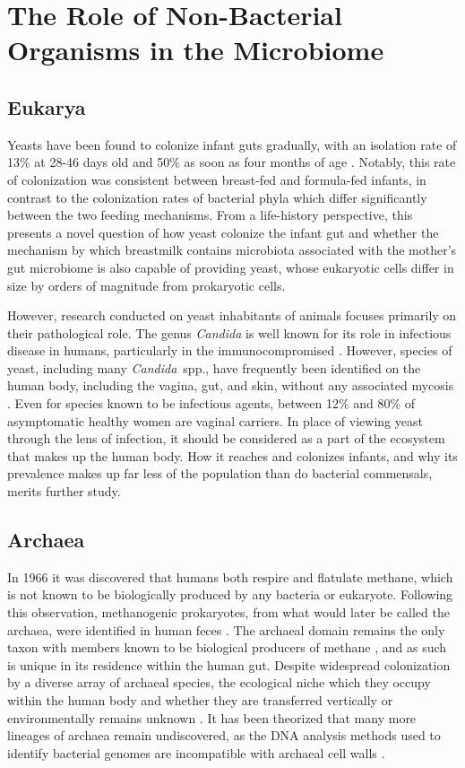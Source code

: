 \documentclass{../../../coursework}
\begin{document}
\section{The Role of Non-Bacterial Organisms in the Microbiome}

\subsection{Eukarya}

Yeasts have been found to colonize infant guts gradually, with an isolation
rate of 13\% at 28-46 days old \parencite{Ben84} and 50\% as
soon as four months of age \parencite{Ell75}.
Notably, this rate of colonization was consistent between breast-fed and
formula-fed infants, in contrast to the colonization rates of bacterial phyla
which differ significantly between the two feeding mechanisms. From a
life-history perspective, this presents a novel question of how yeast
colonize the infant gut and whether the mechanism by which breastmilk
contains microbiota associated with the mother's gut microbiome
\parencite{Mar13} is also capable of providing yeast, whose eukaryotic cells
differ in size by orders of magnitude from prokaryotic cells.

However, research conducted on yeast inhabitants of animals focuses primarily
on their pathological role. The genus \textit{Candida} is well known for its
role in infectious disease in humans, particularly in the immunocompromised
\parencite{Kou11}. However, species of yeast, including many
\textit{Candida}~spp., have frequently been identified on the human body,
including the vagina, gut, and skin, without any associated mycosis
\parencite{Man10}. Even for species known to be infectious agents, between
12\% \parencite{Cho86} and 80\% \parencite{Soe07} of asymptomatic healthy
women are vaginal carriers. In place of viewing yeast through the lens of
infection, it should be considered as a part of the ecosystem that makes up
the human body. How it reaches and colonizes infants, and why its prevalence
makes up far less of the population than do bacterial commensals, merits
further study.

\subsection{Archaea}

In 1966 it was discovered that humans both respire and flatulate methane,
which is not known to be biologically produced by any bacteria or eukaryote.
Following this observation, methanogenic prokaryotes, from what would later
be called the archaea, were identified in human feces \parencite{Not68}. The
archaeal domain remains the only taxon with members known to be biological
producers of methane \parencite{Tha06}, and as such is unique in its
residence within the human gut. Despite widespread colonization by a diverse
array of archaeal species, the ecological niche which they occupy within the
human body and whether they are transferred vertically or environmentally
remains unknown \parencite{Dri11}. It has been theorized that many more
lineages of archaea remain undiscovered, as the DNA analysis methods used to
identify bacterial genomes are incompatible with archaeal cell walls
\parencite{Hor15}.
\end{document}
